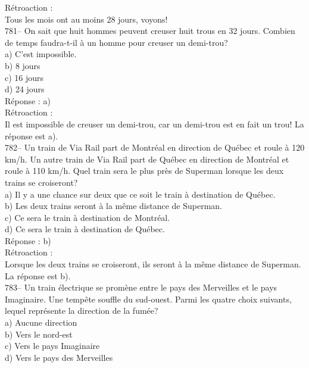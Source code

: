 ﻿\documentclass[letterpaper, 12pt]{article}
\begin{document}
R\'etroaction : \\
Tous les mois ont au moins 28 jours, voyons!  \\

781-- On sait que huit hommes peuvent creuser huit trous en 32 jours.
Combien de temps faudra-t-il \`a un homme pour creuser un demi-trou?\\
a) C'est impossible.\\
b) 8 jours\\
c) 16 jours\\
d) 24 jours\\

R\'eponse : a)\\

R\'etroaction : \\
Il est impossible de creuser un demi-trou, car un demi-trou est en fait un
trou!  La r\'eponse est a).\\

782-- Un train de Via Rail part de Montr\'eal en direction de Qu\'ebec et
roule \`a 120 km/h.  Un autre train de Via Rail part de Qu\'ebec en
direction de Montr\'eal et roule \`a 110 km/h.  Quel train sera le plus
pr\`es de Superman lorsque les deux trains  se croiseront?\\
a) Il y a une chance sur deux que ce soit le train \`a destination de
Qu\'ebec.\\
b) Les deux trains seront \`a la m\^eme distance de Superman.\\
c) Ce sera le train \`a destination de Montr\'eal.\\
d) Ce sera le train \`a destination de Qu\'ebec.\\

R\'eponse : b)\\

R\'etroaction : \\
Lorsque les deux trains se croiseront, ils seront \`a la m\^eme distance de
Superman.  La r\'eponse est b).\\

783-- Un train \'electrique se prom\`ene entre le pays des Merveilles et le
pays Imaginaire.  Une temp\^ete souffle du sud-ouest.  Parmi les quatre
choix suivants, lequel repr\'esente la direction de la fum\'ee?\\
a) Aucune direction\\
b) Vers le nord-est\\
c) Vers le pays Imaginaire\\
d) Vers le pays des Merveilles\\
\end{document}
